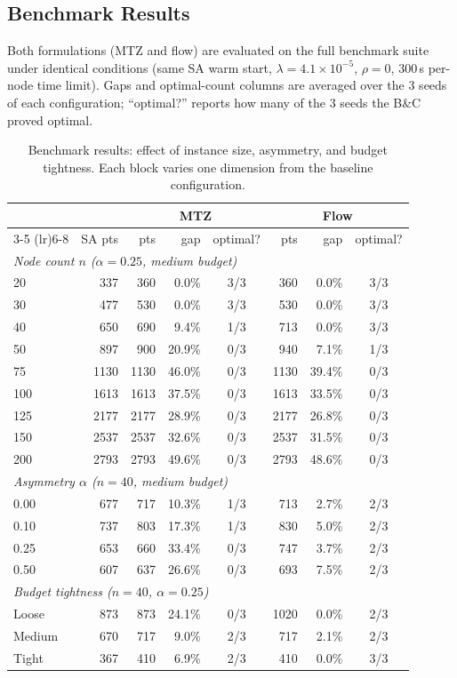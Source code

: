 \documentclass[11pt,a4paper]{article}
\begin{document}
\subsection{Benchmark Results}

Both formulations (MTZ and flow) are evaluated on the full benchmark suite under identical conditions (same SA warm start, $\lambda = 4.1\times10^{-5}$, $\rho = 0$, 300\,s per-node time limit).
Gaps and optimal-count columns are averaged over the 3 seeds of each configuration; ``optimal?'' reports how many of the 3 seeds the B\&C proved optimal.

\begin{table}[H]
\centering
\caption{Benchmark results: effect of instance size, asymmetry, and budget tightness. Each block varies one dimension from the baseline configuration.}
\label{tab:bench_sweeps}
\begin{tabular}{lrrrcrrc}
\toprule
& & \multicolumn{3}{c}{\textbf{MTZ}} & \multicolumn{3}{c}{\textbf{Flow}} \\
\cmidrule(lr){3-5} \cmidrule(lr){6-8}
& SA pts & pts & gap & optimal? & pts & gap & optimal? \\
\midrule
\multicolumn{8}{l}{\textit{Node count $n$ ($\alpha = 0.25$, medium budget)}} \\
20  &  337 &  360 &  0.0\% & 3/3 &  360 &  0.0\% & 3/3 \\
30  &  477 &  530 &  0.0\% & 3/3 &  530 &  0.0\% & 3/3 \\
40  &  650 &  690 &  9.4\% & 1/3 &  713 &  0.0\% & 3/3 \\
50  &  897 &  900 & 20.9\% & 0/3 &  940 &  7.1\% & 1/3 \\
75  & 1130 & 1130 & 46.0\% & 0/3 & 1130 & 39.4\% & 0/3 \\
100 & 1613 & 1613 & 37.5\% & 0/3 & 1613 & 33.5\% & 0/3 \\
125 & 2177 & 2177 & 28.9\% & 0/3 & 2177 & 26.8\% & 0/3 \\
150 & 2537 & 2537 & 32.6\% & 0/3 & 2537 & 31.5\% & 0/3 \\
200 & 2793 & 2793 & 49.6\% & 0/3 & 2793 & 48.6\% & 0/3 \\
\midrule
\multicolumn{8}{l}{\textit{Asymmetry $\alpha$ ($n = 40$, medium budget)}} \\
0.00 &  677 &  717 & 10.3\% & 1/3 &  713 &  2.7\% & 2/3 \\
0.10 &  737 &  803 & 17.3\% & 1/3 &  830 &  5.0\% & 2/3 \\
0.25 &  653 &  660 & 33.4\% & 0/3 &  747 &  3.7\% & 2/3 \\
0.50 &  607 &  637 & 26.6\% & 0/3 &  693 &  7.5\% & 2/3 \\
\midrule
\multicolumn{8}{l}{\textit{Budget tightness ($n = 40$, $\alpha = 0.25$)}} \\
Loose  & 873  &  873 & 24.1\% & 0/3 & 1020 &  0.0\% & 2/3 \\
Medium & 670  &  717 &  9.0\% & 2/3 &  717 &  2.1\% & 2/3 \\
Tight  & 367  &  410 &  6.9\% & 2/3 &  410 &  0.0\% & 3/3 \\
\bottomrule
\end{tabular}
\end{table}
\end{document}
